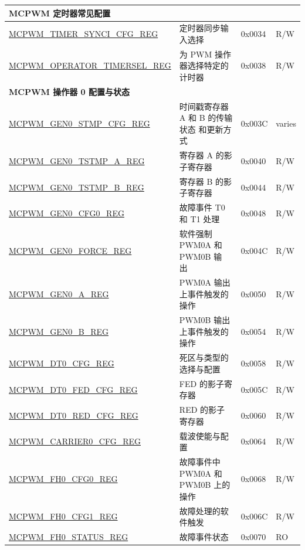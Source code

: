 \begin{longtable}{ | p{6cm} | p{7.2cm} | p{1.2cm} | p{1cm} | }
\multicolumn{3}{|l|}{\textbf{MCPWM 定时器常见配置}} \\ \hline
\hyperref[regdesc:MCPWMTIMERSYNCICFGREG]{MCPWM\_TIMER\_SYNCI\_CFG\_REG} & 定时器同步输入选择 &0x0034 & R/W \\ \hline
\hyperref[regdesc:MCPWMOPERATORTIMERSELREG]{MCPWM\_OPERATOR\_TIMERSEL\_REG} & 为 PWM 操作器选择特定的计时器 & 0x0038 & R/W \\ \hline

\multicolumn{3}{|l|}{\textbf{MCPWM 操作器 0 配置与状态}} \\ \hline
\hyperref[regdesc:MCPWMGEN0STMPCFGREG]{MCPWM\_GEN0\_STMP\_CFG\_REG} & 时间戳寄存器 A 和 B 的传输状态 和更新方式 & 0x003C & varies\\ \hline
\hyperref[regdesc:MCPWMGEN0TSTMPAREG]{MCPWM\_GEN0\_TSTMP\_A\_REG} & 寄存器 A 的影子寄存器 & 0x0040 &  R/W \\ \hline
\hyperref[regdesc:MCPWMGEN0TSTMPBREG]{MCPWM\_GEN0\_TSTMP\_B\_REG} & 寄存器 B 的影子寄存器 & 0x0044 &  R/W \\ \hline
\hyperref[regdesc:MCPWMGEN0CFG0REG]{MCPWM\_GEN0\_CFG0\_REG} & 故障事件 T0 和 T1 处理 & 0x0048 & R/W \\ \hline
\hyperref[regdesc:MCPWMGEN0FORCEREG]{MCPWM\_GEN0\_FORCE\_REG} & 软件强制 PWM0A 和 PWM0B 输 出 & 0x004C & R/W \\ \hline
\hyperref[regdesc:MCPWMGEN0AREG]{MCPWM\_GEN0\_A\_REG} & PWM0A 输出上事件触发的操作 & 0x0050 &  R/W \\ \hline
\hyperref[regdesc:MCPWMGEN0BREG]{MCPWM\_GEN0\_B\_REG} & PWM0B 输出上事件触发的操作 & 0x0054 & R/W \\ \hline
\hyperref[regdesc:MCPWMDT0CFGREG]{MCPWM\_DT0\_CFG\_REG} & 死区与类型的选择与配置 & 0x0058 & R/W \\ \hline
\hyperref[regdesc:MCPWMDT0FEDCFGREG]{MCPWM\_DT0\_FED\_CFG\_REG} & FED 的影子寄存器 & 0x005C & R/W \\ \hline
\hyperref[regdesc:MCPWMDT0REDCFGREG]{MCPWM\_DT0\_RED\_CFG\_REG} & RED 的影子寄存器 & 0x0060 &  R/W \\ \hline
\hyperref[regdesc:MCPWMCARRIER0CFGREG]{MCPWM\_CARRIER0\_CFG\_REG} & 载波使能与配置 & 0x0064 & R/W \\ \hline
\hyperref[regdesc:MCPWMFH0CFG0REG]{MCPWM\_FH0\_CFG0\_REG} & 故障事件中 PWM0A 和 PWM0B 上的操作 & 0x0068 &  R/W \\ \hline
\hyperref[regdesc:MCPWMFH0CFG1REG]{MCPWM\_FH0\_CFG1\_REG} & 故障处理的软件触发 & 0x006C &  R/W \\ \hline
\hyperref[regdesc:MCPWMFH0STATUSREG]{MCPWM\_FH0\_STATUS\_REG} & 故障事件状态 & 0x0070 & RO \\ \hline


\end{longtable}
